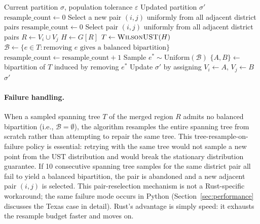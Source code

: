 \begin{algorithm}
\caption{One ReCom Step}
\label{alg:recom}
\begin{algorithmic}[1]
\Require Current partition $\sigma$, population tolerance $\varepsilon$
\Ensure Updated partition $\sigma'$
\State $\text{resample\_count} \leftarrow 0$
\Repeat
    \State Select a new pair $(i, j)$ uniformly from all adjacent district pairs
    \State $\text{resample\_count} \leftarrow 0$
  \EndIf
  \State Select pair $(i, j)$ uniformly from all adjacent district pairs
  \State $R \leftarrow V_i \cup V_j$ 
  \State $H \leftarrow G[R]$ 
  \State $T \leftarrow \textsc{WilsonUST}(H)$ 
  \State $\mathcal{B} \leftarrow \{e \in T : \text{removing } e \text{ gives a balanced bipartition}\}$
  \State $\text{resample\_count} \leftarrow \text{resample\_count} + 1$
\State Sample $e^* \sim \mathrm{Uniform}(\mathcal{B})$
\State $\{A, B\} \leftarrow$ bipartition of $T$ induced by removing $e^*$
\State Update $\sigma'$ by assigning $V_i \leftarrow A$, $V_j \leftarrow B$
\State \Return $\sigma'$
\end{algorithmic}
\end{algorithm}

\paragraph{Failure handling.}
When a sampled spanning tree $T$ of the merged region $R$ admits no
balanced bipartition (i.e., $\mathcal{B} = \emptyset$), the algorithm
resamples the entire spanning tree from scratch rather than attempting to
repair the same tree.
This tree-resample-on-failure policy is essential: retrying with the
same tree would not sample a new point from the UST distribution and
would break the stationary distribution guarantee.
If 10 consecutive spanning tree samples for the same district pair all
fail to yield a balanced bipartition, the pair is abandoned and a new
adjacent pair $(i,j)$ is selected.
This pair-reselection mechanism is not a Rust-specific workaround; the
same failure mode occurs in Python \gc{} (Section~\ref{sec:performance}
discusses the Texas case in detail).
Rust's advantage is simply speed: it exhausts the resample budget faster
and moves on.

